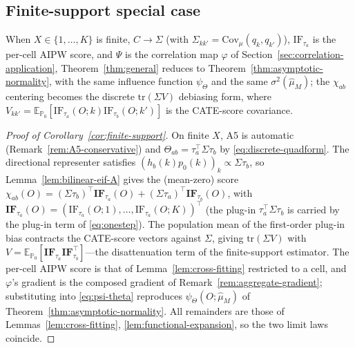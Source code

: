 \subsection{Finite-support special case}

\begin{corollary}
\label{cor:finite-support}
When $X\in\{1,\dots,K\}$ is finite, $C\to\Sigma$ (with $\Sigma_{kk'}=\mathrm{Cov}_\mu(q_k,q_{k'})$),
$\mathrm{IF}_{\tau_a}$ is the per-cell AIPW score, and $\Psi$ is the correlation map $\varphi$ of
Section~\ref{sec:correlation-application}, Theorem~\ref{thm:general} reduces to
Theorem~\ref{thm:asymptotic-normality}, with the same influence function $\psi_\Theta$ and the
same $\sigma^2(\hat\mu_M)$; the $\chi_{ab}$ centering becomes the discrete $\mathrm{tr}(\Sigma V)$
debiasing form, where $V_{kk'}=\mathbb{E}_{\mathbb{P}_0}[\mathrm{IF}_{\tau_a}(O;k)\mathrm{IF}_{\tau_b}(O;k')]$
is the CATE-score covariance.
\end{corollary}

\begin{proof}[Proof of Corollary~\ref{cor:finite-support}]
On finite $X$, A5 is automatic (Remark~\ref{rem:A5-conservative}) and
$\Theta_{ab}=\tau_a^\top\Sigma\tau_b$ by \eqref{eq:discrete-quadform}. The directional representer
satisfies $(h_b(k)p_0(k))_k \propto \Sigma\tau_b$, so Lemma~\ref{lem:bilinear-eif-A} gives the
(mean-zero) score
$\chi_{ab}(O)=(\Sigma\tau_b)^\top\mathbf{IF}_{\tau_a}(O)+(\Sigma\tau_a)^\top\mathbf{IF}_{\tau_b}(O)$,
with $\mathbf{IF}_{\tau_a}(O)=(\mathrm{IF}_{\tau_a}(O;1),\dots,\mathrm{IF}_{\tau_a}(O;K))^\top$
(the plug-in $\tau_a^\top\Sigma\tau_b$ is carried by the plug-in term of \eqref{eq:onestep}).
The population mean of the first-order plug-in bias contracts the CATE-score vectors against
$\Sigma$, giving $\mathrm{tr}(\Sigma V)$ with
$V=\mathbb{E}_{\mathbb{P}_0}[\mathbf{IF}_{\tau_a}\mathbf{IF}_{\tau_b}^\top]$---the disattenuation
term of the finite-support estimator. The per-cell AIPW score is that of
Lemma~\ref{lem:cross-fitting} restricted to a cell, and $\varphi$'s gradient is the composed
gradient of Remark~\ref{rem:aggregate-gradient}; substituting into \eqref{eq:psi-theta} reproduces
$\psi_\Theta(O;\hat\mu_M)$ of Theorem~\ref{thm:asymptotic-normality}. All remainders are those of
Lemmas~\ref{lem:cross-fitting}, \ref{lem:functional-expansion}, so the two limit laws coincide.
\end{proof}

